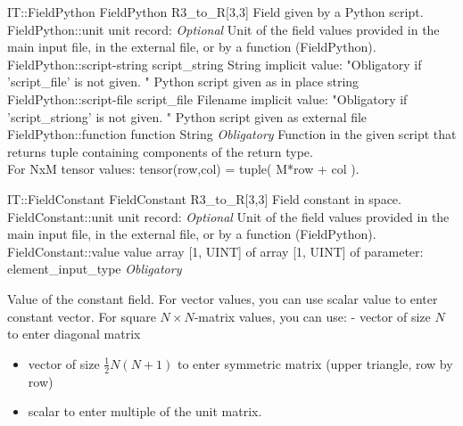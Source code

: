 \begin{RecordType}
	{IT::FieldPython}
	{FieldPython}
	{}%
	{}%
	{{{R3{\_}to{\_}R[3,3] Field given by a Python script.}%
}}
		\RecKey
			{FieldPython::unit}
			{unit}
			{{record: }}{}
			{ \it{Optional}}
			{{{Unit of the field values provided in the main input file, in the external file, or by a function (FieldPython).}%
}}
		\RecKey
			{FieldPython::script-string}
			{script{\_}string}
			{{String}}{}
			{implicit value: "{Obligatory if 'script{\_}file' is not given. }"}
			{{{Python script given as in place string}%
}}
		\RecKey
			{FieldPython::script-file}
			{script{\_}file}
			{{Filename}}{}
			{implicit value: "{Obligatory if 'script{\_}striong' is not given. }"}
			{{{Python script given as external file}%
}}
		\RecKey
			{FieldPython::function}
			{function}
			{{String}}{}
			{ \it{Obligatory}}
			{{{Function in the given script that returns tuple containing components of the return type.}\\{
For NxM tensor values: tensor(row,col) = tuple( M*row + col ).}%
}}
\end{RecordType}
\begin{RecordType}
	{IT::FieldConstant}
	{FieldConstant}
	{}%
	{}%
	{{{R3{\_}to{\_}R[3,3] Field constant in space.}%
}}
		\RecKey
			{FieldConstant::unit}
			{unit}
			{{record: }}{}
			{ \it{Optional}}
			{{{Unit of the field values provided in the main input file, in the external file, or by a function (FieldPython).}%
}}
		\RecKey
			{FieldConstant::value}
			{value}
			{{array [1, UINT] of }{array [1, UINT] of }{parameter: element{\_}input{\_}type}}{}
			{ \it{Obligatory}}
			{{{{Value of the constant field.
For vector values, you can use scalar value to enter constant vector.
For square }{$N\times N$}{-matrix values, you can use:  - vector of size }{$N$}{ to enter diagonal matrix}
% 
}
\begin{itemize}
\item {vector of size }{$\frac12N(N+1)$}{ to enter symmetric matrix (upper triangle, row by row)}
\item {scalar to enter multiple of the unit matrix.}
\end{itemize}
}}
\end{RecordType}
